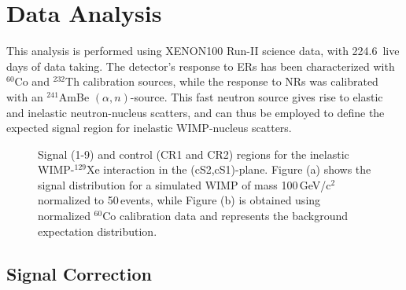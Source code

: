\section{Data Analysis}
\label{sec:analysis}

This analysis is performed using XENON100 Run-II science data, with 224.6~live days of data taking. The detector's response to ERs has been characterized with $^{60}$Co and $^{232}$Th calibration sources, while the response to NRs was calibrated with an $^{241}$AmBe $(\alpha,n)$-source. This fast neutron source gives rise to elastic and inelastic neutron-nucleus scatters, and can thus be employed to define the expected signal region for inelastic WIMP-nucleus scatters.


\begin{figure}[t!]
	\caption{Signal (1-9) and control (CR1 and CR2) regions for the inelastic WIMP-$^{129}$Xe interaction in the (cS2,cS1)-plane.
		Figure (a) shows the signal distribution for a simulated WIMP of mass 100\,GeV/c$^2$ normalized to 50\,events, while Figure (b) is obtained using  
		normalized $^{60}$Co calibration data and represents the background expectation distribution.}
  \label{fig:SR}
\end{figure}

\subsection{Signal Correction} 

